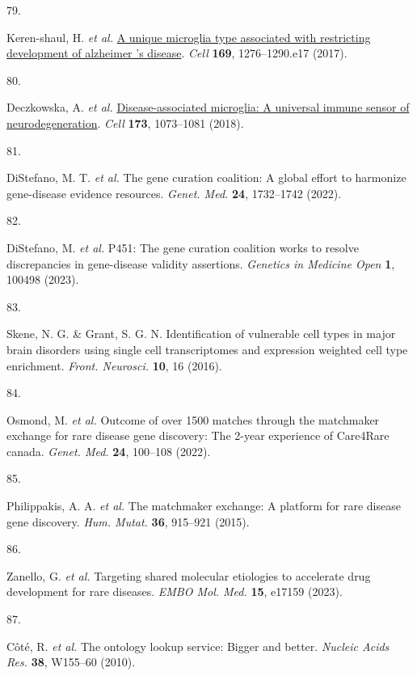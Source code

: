 \documentclass[
]{article}
\newlength{\cslhangindent}
\newlength{\csllabelwidth}
\newenvironment{CSLReferences}[2] %
 {\begin{list}{}{%
  \setlength{\itemindent}{0pt}
  \setlength{\leftmargin}{0pt}
  \setlength{\parsep}{0pt}
  \ifodd #1
   \setlength{\leftmargin}{\cslhangindent}
   \setlength{\itemindent}{-1\cslhangindent}
  \fi
  \setlength{\itemsep}{#2\baselineskip}}}
 {\end{list}}
\newcommand{\CSLLeftMargin}[1]{\parbox[t]{\csllabelwidth}{\strut#1\strut}}
\newcommand{\CSLRightInline}[1]{\parbox[t]{\linewidth - \csllabelwidth}{\strut#1\strut}}
\begin{document}
\begin{CSLReferences}{0}{0}
\CSLLeftMargin{79. }%
\CSLRightInline{Keren-shaul, H. \emph{et al.}
\href{https://doi.org/10.1016/j.cell.2017.05.018}{A unique microglia
type associated with restricting development of alzheimer 's disease}.
\emph{Cell} \textbf{169}, 1276--1290.e17 (2017).}

\CSLLeftMargin{80. }%
\CSLRightInline{Deczkowska, A. \emph{et al.}
\href{https://doi.org/10.1016/j.cell.2018.05.003}{Disease-associated
microglia: A universal immune sensor of neurodegeneration}. \emph{Cell}
\textbf{173}, 1073--1081 (2018).}

\CSLLeftMargin{81. }%
\CSLRightInline{DiStefano, M. T. \emph{et al.} The gene curation
coalition: A global effort to harmonize gene-disease evidence resources.
\emph{Genet. Med.} \textbf{24}, 1732--1742 (2022).}

\CSLLeftMargin{82. }%
\CSLRightInline{DiStefano, M. \emph{et al.} P451: The gene curation
coalition works to resolve discrepancies in gene-disease validity
assertions. \emph{Genetics in Medicine Open} \textbf{1}, 100498 (2023).}

\CSLLeftMargin{83. }%
\CSLRightInline{Skene, N. G. \& Grant, S. G. N. Identification of
vulnerable cell types in major brain disorders using single cell
transcriptomes and expression weighted cell type enrichment.
\emph{Front. Neurosci.} \textbf{10}, 16 (2016).}

\CSLLeftMargin{84. }%
\CSLRightInline{Osmond, M. \emph{et al.} Outcome of over 1500 matches
through the matchmaker exchange for rare disease gene discovery: The
2-year experience of {Care4Rare} canada. \emph{Genet. Med.} \textbf{24},
100--108 (2022).}

\CSLLeftMargin{85. }%
\CSLRightInline{Philippakis, A. A. \emph{et al.} The matchmaker
exchange: A platform for rare disease gene discovery. \emph{Hum. Mutat.}
\textbf{36}, 915--921 (2015).}

\CSLLeftMargin{86. }%
\CSLRightInline{Zanello, G. \emph{et al.} Targeting shared molecular
etiologies to accelerate drug development for rare diseases. \emph{EMBO
Mol. Med.} \textbf{15}, e17159 (2023).}

\CSLLeftMargin{87. }%
\CSLRightInline{Côté, R. \emph{et al.} The ontology lookup service:
Bigger and better. \emph{Nucleic Acids Res.} \textbf{38}, W155--60
(2010).}


\end{CSLReferences}
\end{document}
